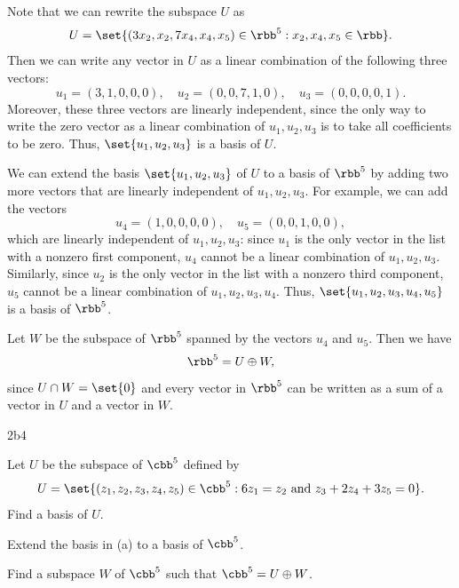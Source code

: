 \begin{solenum}
    \item Note that we can rewrite the subspace $U$ as
    \[
    	U = \set{(3x_2, x_2, 7x_4, x_4, x_5) \in \rbb^5 : x_2, x_4, x_5 \in \rbb}.
    \]
    Then we can write any vector in $U$ as a linear combination of the following three vectors:
    \[
    	u_1 = (3, 1, 0, 0, 0), \quad u_2 = (0, 0, 7, 1, 0), \quad u_3 = (0, 0, 0, 0, 1).
    \]
    Moreover, these three vectors are linearly independent, since the only way to write the zero vector as a linear combination of $u_1, u_2, u_3$ is to take all coefficients to be zero.
	Thus, $\set{u_1, u_2, u_3}$ is a basis of $U$.
    \item We can extend the basis $\set{u_1, u_2, u_3}$ of $U$ to a basis of $\rbb^5$ by adding two more vectors that are linearly independent of $u_1, u_2, u_3$.
	For example, we can add the vectors
    \[
    	u_4 = (1, 0, 0, 0, 0), \quad u_5 = (0, 0, 1, 0, 0),
    \]
    which are linearly independent of $u_1, u_2, u_3$: since $u_1$ is the only vector in the list with a nonzero first component, $u_4$ cannot be a linear combination of $u_1, u_2, u_3$.
	Similarly, since $u_2$ is the only vector in the list with a nonzero third component, $u_5$ cannot be a linear combination of $u_1, u_2, u_3, u_4$.
	Thus, $\set{u_1, u_2, u_3, u_4, u_5}$ is a basis of $\rbb^5$.
    \item Let $W$ be the subspace of $\rbb^5$ spanned by the vectors $u_4$ and $u_5$.
	Then we have
    \[
    	\rbb^5 = U \oplus W,
    \]
    since $U \cap W = \set{0}$ and every vector in $\rbb^5$ can be written as a sum of a vector in $U$ and a vector in $W$.
\end{solenum}

\begin{exercise}{2b4}
    \begin{subexercises}
        \item Let $U$ be the subspace of $\cbb^5$ defined by
        \[
        	U = \set{(z_1, z_2, z_3, z_4, z_5) \in \cbb^5 : 6z_1 = z_2 \text{ and } z_3 + 2z_4 + 3z_5 = 0}.
        \]
        Find a basis of $U$.
        \item Extend the basis in (a) to a basis of $\cbb^5$.
        \item Find a subspace $W$ of $\cbb^5$ such that $\cbb^5 = U \oplus W$.
    \end{subexercises}
\end{exercise}

